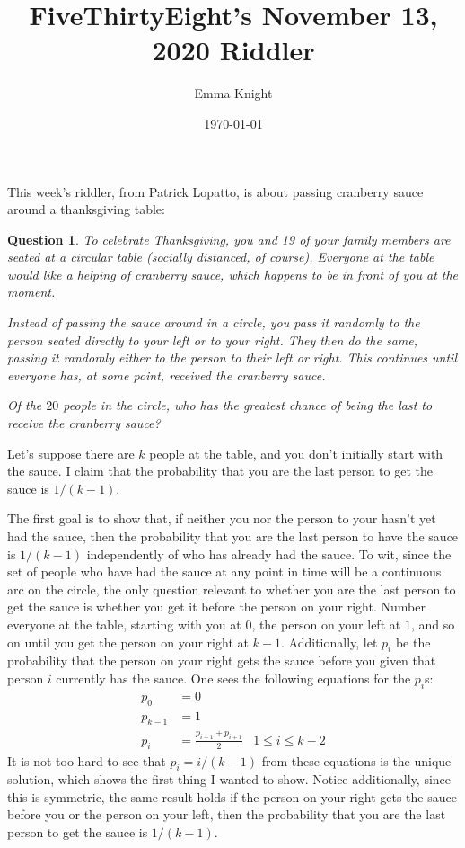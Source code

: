 \documentclass[11pt]{article}
\title{FiveThirtyEight's November 13, 2020 Riddler}
\author{Emma Knight}
\date{\today}
\newtheorem{question}[theorem]{Question}
\theoremstyle{definition}
\begin{document}
\maketitle
This week's riddler, from Patrick Lopatto, is about passing cranberry sauce around a thanksgiving table:
\begin{question}
To celebrate Thanksgiving, you and 19 of your family members are seated at a circular table (socially distanced, of course). Everyone at the table would like a helping of cranberry sauce, which happens to be in front of you at the moment.

Instead of passing the sauce around in a circle, you pass it randomly to the person seated directly to your left or to your right. They then do the same, passing it randomly either to the person to their left or right. This continues until everyone has, at some point, received the cranberry sauce.

Of the $20$ people in the circle, who has the greatest chance of being the last to receive the cranberry sauce?
\end{question}
Let's suppose there are $k$ people at the table, and you don't initially start with the sauce.  I claim that the probability that you are the last person to get the sauce is $1/(k-1)$.

The first goal is to show that, if neither you nor the person to your hasn't yet had the sauce, then the probability that you are the last person to have the sauce is $1/(k-1)$ independently of who has already had the sauce.  To wit, since the set of people who have had the sauce at any point in time will be a continuous arc on the circle, the only question relevant to whether you are the last person to get the sauce is whether you get it before the person on your right.  Number everyone at the table, starting with you at $0$, the person on your left at $1$, and so on until you get the person on your right at $k-1$.  Additionally, let $p_i$ be the probability that the person on your right gets the sauce before you given that person $i$ currently has the sauce.  One sees the following equations for the $p_i$s:
\begin{align*}
p_0 &= 0 \\
p_{k-1} & = 1 \\
p_i & = \frac{p_{i-1} + p_{i+1}}{2}&1\leq i \leq k-2
\end{align*}
It is not too hard to see that $p_i = i/(k-1)$ from these equations is the unique solution, which shows the first thing I wanted to show.  Notice additionally, since this is symmetric, the same result holds if the person on your right gets the sauce before you or the person on your left, then the probability that you are the last person to get the sauce is $1/(k-1)$.
\end{document}
